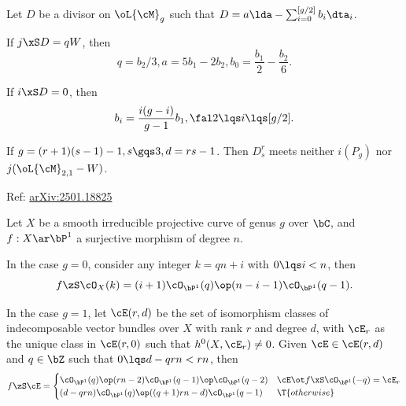 \documentclass[a4paper, twoside]{article}
\begin{document}
\begin{thm}
	Let $D$ be a divisor on $\oL{\cM}_{g}$ such that $D=a\lda-\sum_{i=0}^{[g/2]}b_{i}\dta_{i}$.
	\begin{enr}
		\item If $j\xS D=qW$, then
		\[
			q=b_{2}/3, a=5b_{1}-2b_{2}, b_{0}=\frac{b_{1}}{2}-\frac{b_{2}}{6}.
		\]
		\item If $i\xS D=0$, then
		\[
			b_{i}=\frac{i(g-i)}{g-1}b_{1}, \fal 2\lqs i\lqs [g/2].
		\]
	\end{enr}
\end{thm}


\begin{thm}[Proposition~4.1]
	If $g=(r+1)(s-1)-1, s\gqs3, d=rs-1$. Then $D_{s}^{r}$ meets neither $i(P_{g})$ nor $j(\oL{\cM}_{2,1}-W)$.
\end{thm}



Ref: \href{https://arxiv.org/pdf/2501.18825}{arXiv:2501.18825}

\begin{stp}
	Let $X$ be a smooth irreducible projective curve of genus $g$ over $\bC$, and $f:X\ar\bP^{1}$ a surjective morphism of degree $n$.
\end{stp}

\begin{thm}
	In the case $g=0$, consider any integer $k=qn+i$ with $0\lqs i< n$, then
	\[
		f\zS\cO_{X}(k)=(i+1)\cO_{\bP^{1}}(q)\op(n-i-1)\cO_{\bP^{1}}(q-1).
	\]
\end{thm}


\begin{thm}
	In the case $g=1$, let $\cE(r,d)$ be the set of isomorphism classes of indecomposable vector bundles over $X$ with rank $r$ and degree $d$, with $\cE_{r}$ as the unique class in $\cE(r,0)$ such that $h^{0}(X,\cE_{r})\neq0$. Given $\cE\in\cE(r,d)$ and $q\in\bZ$ such that $0\lqs d-qrn<rn$, then
	\[
		f\zS\cE=\begin{cases}
		  \cO_{\bP^{1}}(q)\op(rn-2)\cO_{\bP^{1}}(q-1)\op\cO_{\bP^{1}}(q-2) & \cE\ot f\xS\cO_{\bP^{1}}(-q)=\cE_{r} \\
		  (d-qrn)\cO_{\bP^{1}}(q)\op((q+1)rn-d)\cO_{\bP^{1}}(q-1) & \T{otherwise}
		\end{cases}
	\]
\end{thm}
\end{document}
